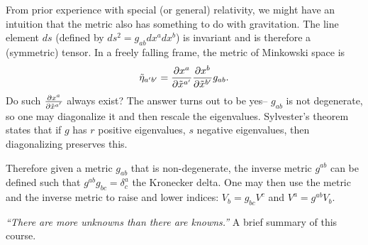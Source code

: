 From prior experience with special (or general) relativity, we might have an intuition that the metric also has something to do with gravitation. The line element $ds$ (defined by $ds^2 = g_{ab}dx^a dx^b$) is invariant and is therefore a (symmetric) tensor. In a freely falling frame, the metric of Minkowski space is $$\tilde \eta_{a'b'} = \frac{\partial x^a}{\partial\tilde x^{a'}}\frac{\partial x^b}{\partial \tilde x^{b'} }g_{ab}.$$ Do such $\frac{\partial x^a}{\partial\tilde x^{a'}}$ always exist? The answer turns out to be yes-- $g_{ab}$ is not degenerate, so one may diagonalize it and then rescale the eigenvalues. Sylvester's theorem states that if $g$ has $r$ positive eigenvalues, $s$ negative eigenvalues, then diagonalizing preserves this.%

Therefore given a metric $g_{ab}$ that is non-degenerate, the inverse metric $g^{ab}$ can be defined such that $g^{ab}g_{bc}=\delta^a_c$ the Kronecker delta. One may then use the metric and the inverse metric to raise and lower indices:
$V_b=g_{bc}V^c$ and $V^a = g^{ab}V_b$.

\textit{``There are more unknowns than there are knowns.''} A brief summary of this course.